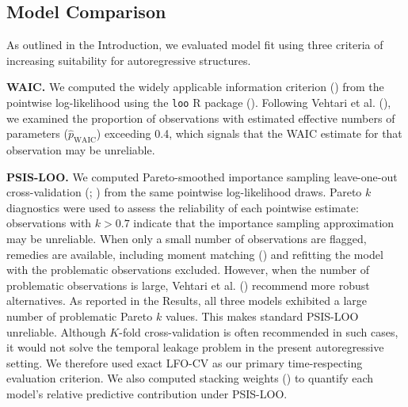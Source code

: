 \documentclass[
  man,
  floatsintext,
  longtable,
  nolmodern,
  notxfonts,
  notimes,
  colorlinks=true,linkcolor=blue,citecolor=blue,urlcolor=blue]{apa7}
\begin{document}
\subsection{Model Comparison}\label{model-comparison}

As outlined in the Introduction, we evaluated model fit using three
criteria of increasing suitability for autoregressive structures.

\textbf{WAIC.} We computed the widely applicable information criterion
() from the pointwise
log-likelihood using the \texttt{loo} R package
(). Following
Vehtari et al. (), we examined
the proportion of observations with estimated effective numbers of
parameters (\(\hat{p}_{\text{WAIC}}\)) exceeding 0.4, which signals that
the WAIC estimate for that observation may be unreliable.

\textbf{PSIS-LOO.} We computed Pareto-smoothed importance sampling
leave-one-out cross-validation
(;
) from the same
pointwise log-likelihood draws. Pareto \(k\) diagnostics were used to
assess the reliability of each pointwise estimate: observations with
\(k > 0.7\) indicate that the importance sampling approximation may be
unreliable. When only a small number of observations are flagged,
remedies are available, including moment matching
() and refitting
the model with the problematic observations excluded. However, when the
number of problematic observations is large, Vehtari et al.
() recommend more robust
alternatives. As reported in the Results, all three models exhibited a
large number of problematic Pareto \(k\) values. This makes standard
PSIS-LOO unreliable. Although \(K\)-fold cross-validation is often
recommended in such cases, it would not solve the temporal leakage
problem in the present autoregressive setting. We therefore used exact
LFO-CV as our primary time-respecting evaluation criterion. We also
computed stacking weights () to quantify each model's relative predictive contribution under
PSIS-LOO.
\end{document}

